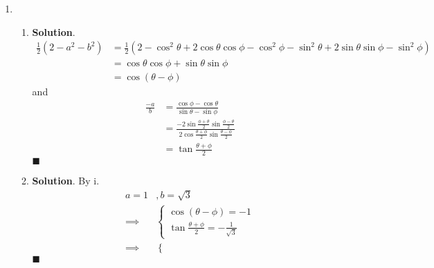 \documentclass[12pt]{article}
\newenvironment*{sol}{\par \textbf{Solution}.}{\hfill$\blacksquare$}
\begin{document}
\begin{enumerate}
\begin{enumerate}
\begin{sol}
                Hence $\cot{\theta}$ solve the equation $x^4-4x^3-6x^2+4x+1=0$ when $\cot{4\theta}=1$, which is \begin{align*}
                    4\theta&=n\pi+\pi/4\\
                    \theta&=n\pi/4+\pi/16\\
                    x&=\cot(\pi/16),\cot(5\pi/16),\cot(9\pi/16),\cot(13\pi/16)
                \end{align*}
                restricting to $[0,2\pi]$.
            \end{sol}
            \item \begin{enumerate}
                \item \begin{sol}
                    \begin{align*}
                        \frac{1}{2}(2-a^2-b^2)&=\frac{1}{2}(2-\cos^2{\theta}+2\cos{\theta}\cos{\phi}-\cos^2{\phi}-\sin^2{\theta}+2\sin{\theta}\sin{\phi}-\sin^2{\phi})\\
                        &=\cos{\theta}\cos{\phi}+\sin{\theta}\sin{\phi}\\
                        &=\cos{(\theta-\phi)}
                    \end{align*}
                    and \begin{align*}
                        \frac{-a}{b}&=\frac{\cos{\phi}-\cos{\theta}}{\sin{\theta}-\sin{\phi}}\\
                        &=\frac{-2\sin{\frac{\phi+\theta}{2}}\sin{\frac{\phi-\theta}{2}}}{2\cos{\frac{\theta+\phi}{2}}\sin{\frac{\theta-\phi}{2}}}\\
                        &=\tan{\frac{\theta+\phi}{2}}
                    \end{align*}
                \end{sol}
                \item \begin{sol}
                    By i.\begin{align*}
                        a=1&,b=\sqrt{3}\\
                        \implies&\begin{cases}
                            \cos{(\theta-\phi)}=-1\\
                            \tan{\frac{\theta+\phi}{2}}=-\frac{1}{\sqrt{3}}
                        \end{cases}\\
                        \implies&\begin{cases}

\end{cases}
\end{align*}
\end{sol}
\end{enumerate}
\end{enumerate}
\end{enumerate}
\end{document}
